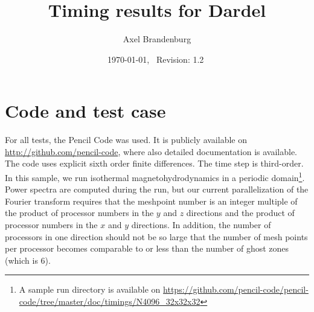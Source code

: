 \documentclass[twocolumn]{article}
\title{Timing results for Dardel}
\author{Axel Brandenburg}
\date{\today,~ $ $Revision: 1.2 $ $}
\begin{document}
\maketitle

\section{Code and test case}

For all tests, the {\sc Pencil Code} was used.
It is publicly available on \url{http://github.com/pencil-code},
where also detailed documentation is available.
The code uses explicit sixth order finite differences.
The time step is third-order.
In this sample, we run isothermal magnetohydrodynamics
in a periodic domain\footnote{A sample run directory is available on
\url{https://github.com/pencil-code/pencil-code/tree/master/doc/timings/N4096_32x32x32}}.
Power spectra are computed during the run, but our
current parallelization of the Fourier transform
requires that the meshpoint number is an integer multiple
of the product of processor numbers in the $y$ and $z$ directions
and the product of processor numbers in the $x$ and $y$ directions.
In addition, the number of processors in one direction should not
be so large that the number of mesh points per processor becomes
comparable to or less than the number of ghost zones (which is 6).
\end{document}
